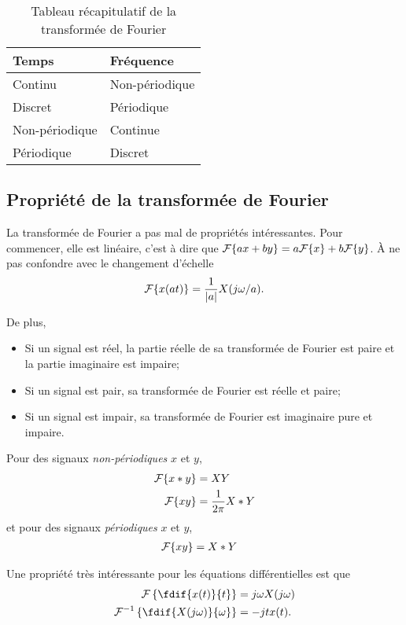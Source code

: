 \begin{table}
  \centering
  \begin{tabular}{|l|l|}
    \hline
    \textbf{Temps} & \textbf{Fréquence}\\
    \hline
    Continu & Non-périodique\\
    \hline
    Discret & Périodique\\
    \hline
    Non-périodique & Continue\\
    \hline
    Périodique & Discret\\
    \hline
  \end{tabular}
  \caption{Tableau récapitulatif de la transformée de Fourier}
  \label{tab:recap_fourier}
\end{table}

\subsection{Propriété de la transformée de Fourier}
La transformée de Fourier a pas mal de propriétés intéressantes.
Pour commencer, elle est linéaire, c'est à dire que
$\mathcal{F}\{ax + by\} = a\mathcal{F}\{x\} + b\mathcal{F}\{y\}$.
À ne pas confondre avec le changement d'échelle
\[ \mathcal{F}\{x(at)\} = \frac{1}{|a|}X(j\omega/a). \]

De plus,
\begin{itemize}
  \item Si un signal est réel,
    la partie réelle de sa transformée de Fourier est paire et
    la partie imaginaire est impaire;
  \item Si un signal est pair, sa transformée de Fourier est réelle et paire;
  \item Si un signal est impair,
    sa transformée de Fourier est imaginaire pure et impaire.
\end{itemize}

Pour des signaux \emph{non-périodiques} $x$ et $y$,
\begin{align}
  \nonumber
  \mathcal{F}\{x * y\} & = X Y\\
  \label{eq:prod2conv}
  \mathcal{F}\{xy\} & = \frac{1}{2\pi}X * Y
\end{align}
et pour des signaux \emph{périodiques} $x$ et $y$,
\begin{align*}
  \mathcal{F}\{xy\} & = X * Y
\end{align*}

Une propriété très intéressante pour les équations différentielles est que
\begin{align*}
  \fourier\left\{\fdif{x(t)}{t}\right\} & = j\omega X(j\omega)\\
  \fourier^{-1}\left\{\fdif{X(j\omega)}{\omega}\right\} & =
  -jtx(t).
\end{align*}

